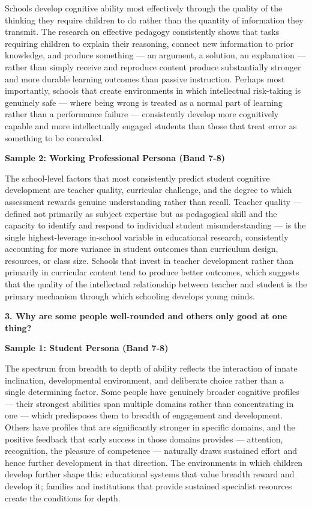 Schools develop cognitive ability most effectively through the quality of the thinking they require children to do rather than the quantity of information they transmit. The research on effective pedagogy consistently shows that tasks requiring children to explain their reasoning, connect new information to prior knowledge, and produce something — an argument, a solution, an explanation — rather than simply receive and reproduce content produce substantially stronger and more durable learning outcomes than passive instruction. Perhaps most importantly, schools that create environments in which intellectual risk-taking is genuinely safe — where being wrong is treated as a normal part of learning rather than a performance failure — consistently develop more cognitively capable and more intellectually engaged students than those that treat error as something to be concealed.

\textbf{Sample 2: Working Professional Persona (Band 7-8)}

The school-level factors that most consistently predict student cognitive development are teacher quality, curricular challenge, and the degree to which assessment rewards genuine understanding rather than recall. Teacher quality — defined not primarily as subject expertise but as pedagogical skill and the capacity to identify and respond to individual student misunderstanding — is the single highest-leverage in-school variable in educational research, consistently accounting for more variance in student outcomes than curriculum design, resources, or class size. Schools that invest in teacher development rather than primarily in curricular content tend to produce better outcomes, which suggests that the quality of the intellectual relationship between teacher and student is the primary mechanism through which schooling develops young minds.

\separator

\begin{ieltsquestion}
\textbf{3. Why are some people well-rounded and others only good at one thing?}
\end{ieltsquestion}
\textbf{Sample 1: Student Persona (Band 7-8)}

The spectrum from breadth to depth of ability reflects the interaction of innate inclination, developmental environment, and deliberate choice rather than a single determining factor. Some people have genuinely broader cognitive profiles — their strongest abilities span multiple domains rather than concentrating in one — which predisposes them to breadth of engagement and development. Others have profiles that are significantly stronger in specific domains, and the positive feedback that early success in those domains provides — attention, recognition, the pleasure of competence — naturally draws sustained effort and hence further development in that direction. The environments in which children develop further shape this: educational systems that value breadth reward and develop it; families and institutions that provide sustained specialist resources create the conditions for depth.

